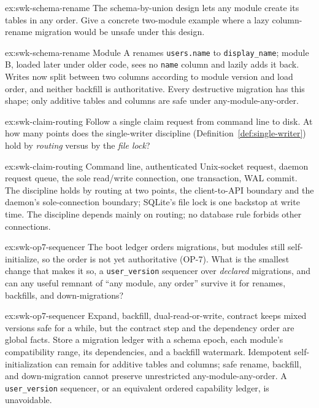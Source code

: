 \documentclass[11pt,a4paper]{article}
\theoremstyle{definition}
\theoremstyle{remark}
\begin{document}
\begin{pdexercise}[kind=Check,rating=1]{ex:swk-schema-rename}
The schema-by-union design lets any module create its tables in any order. Give a concrete two-module example where a lazy column-rename migration would be unsafe under this design.
\end{pdexercise}
\begin{pdsolution}{ex:swk-schema-rename}
Module A renames \texttt{users.name} to \texttt{display\_name}; module B, loaded later under older code, sees no \texttt{name} column and lazily adds it back. Writes now split between two columns according to module version and load order, and neither backfill is authoritative. Every destructive migration has this shape; only additive tables and columns are safe under any-module-any-order.
\end{pdsolution}
\begin{pdexercise}[kind=Trace,rating=2]{ex:swk-claim-routing}
Follow a single claim request from command line to disk. At how many points does the single-writer discipline (Definition~\ref{def:single-writer}) hold by \emph{routing} versus by the \emph{file lock}?
\end{pdexercise}
\begin{pdsolution}{ex:swk-claim-routing}
Command line, authenticated Unix-socket request, daemon request queue, the sole read/write connection, one transaction, WAL commit. The discipline holds by routing at two points, the client-to-API boundary and the daemon's sole-connection boundary; SQLite's file lock is one backstop at write time. The discipline depends mainly on routing; no database rule forbids other connections.
\end{pdsolution}
\begin{pdexercise}[kind=Open,rating=3]{ex:swk-op7-sequencer}
The boot ledger orders migrations, but modules still self-initialize, so the order is not yet authoritative (OP-7). What is the smallest change that makes it so, a \texttt{user\_version} sequencer over \emph{declared} migrations, and can any useful remnant of ``any module, any order'' survive it for renames, backfills, and down-migrations?
\end{pdexercise}
\begin{pdsolution}{ex:swk-op7-sequencer}
Expand, backfill, dual-read-or-write, contract keeps mixed versions safe for a while, but the contract step and the dependency order are global facts. Store a migration ledger with a schema epoch, each module's compatibility range, its dependencies, and a backfill watermark. Idempotent self-initialization can remain for additive tables and columns; safe rename, backfill, and down-migration cannot preserve unrestricted any-module-any-order. A \texttt{user\_version} sequencer, or an equivalent ordered capability ledger, is unavoidable.
\end{pdsolution}
\end{document}
